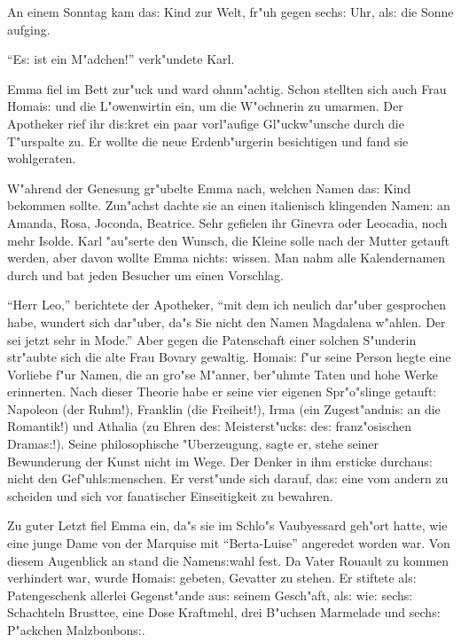 \documentclass[oneside,12pt]{book}
\newcommand{\s}{s:}%
\begin{document}
An einem Sonntag kam da{\s} Kind zur Welt, fr"uh gegen sech{\s}
Uhr, al{\s} die Sonne aufging.

"`E{\s} ist ein M"adchen!"' verk"undete Karl.

Emma fiel im Bett zur"uck und ward ohnm"achtig. Schon stellten
sich auch Frau Homai{\s} und die L"owenwirtin ein, um die
W"ochnerin zu umarmen. Der Apotheker rief ihr di{\s}kret ein paar
vorl"aufige Gl"uckw"unsche durch die T"urspalte zu. Er wollte die
neue Erdenb"urgerin besichtigen und fand sie wohlgeraten.

W"ahrend der Genesung gr"ubelte Emma nach, welchen Namen da{\s}
Kind bekommen sollte. Zun"achst dachte sie an einen italienisch
klingenden Namen: an Amanda, Rosa, Joconda, Beatrice. Sehr
gefielen ihr Ginevra oder Leocadia, noch mehr Isolde. Karl
"au"serte den Wunsch, die Kleine solle nach der Mutter getauft
werden, aber davon wollte Emma nicht{\s} wissen. Man nahm alle
Kalendernamen durch und bat jeden Besucher um einen Vorschlag.

"`Herr Leo,"' berichtete der Apotheker, "`mit dem ich neulich
dar"uber gesprochen habe, wundert sich dar"uber, da"s Sie nicht
den Namen Magdalena w"ahlen. Der sei jetzt sehr in Mode."' Aber
gegen die Patenschaft einer solchen S"underin str"aubte sich die
alte Frau Bovary gewaltig. Homai{\s} f"ur seine Person hegte eine
Vorliebe f"ur Namen, die an gro"se M"anner, ber"uhmte Taten und
hohe Werke erinnerten. Nach dieser Theorie habe er seine vier
eigenen Spr"o"slinge getauft: Napoleon (der Ruhm!), Franklin (die
Freiheit!), Irma (ein Zugest"andni{\s} an die Romantik!) und
Athalia (zu Ehren de{\s} Meisterst"uck{\s} de{\s} franz"osischen
Drama{\s}!). Seine philosophische "Uberzeugung, sagte er, stehe
seiner Bewunderung der Kunst nicht im Wege. Der Denker in ihm
ersticke durchau{\s} nicht den Gef"uhl{\s}menschen. Er verst"unde
sich darauf, da{\s} eine vom andern zu scheiden und sich vor
fanatischer Einseitigkeit zu bewahren.

Zu guter Letzt fiel Emma ein, da"s sie im Schlo"s Vaubyessard
geh"ort hatte, wie eine junge Dame von der Marquise mit
"`Berta-Luise"' angeredet worden war. Von diesem Augenblick an
stand die Namen{\s}wahl fest. Da Vater Rouault zu kommen
verhindert war, wurde Homai{\s} gebeten, Gevatter zu stehen. Er
stiftete al{\s} Patengeschenk allerlei Gegenst"ande au{\s} seinem
Gesch"aft, al{\s} wie: sech{\s} Schachteln Brusttee, eine Dose
Kraftmehl, drei B"uchsen Marmelade und sech{\s} P"ackchen
Malzbonbon{\s}.
\end{document}
